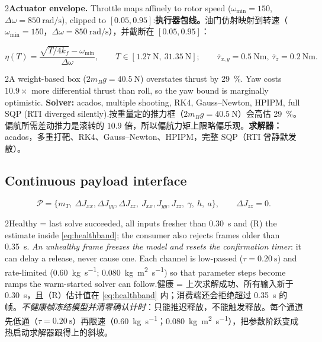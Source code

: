 \documentclass[10pt,a4paper]{article}
\numberwithin{equation}{section}
\newcommand{\dJ}{\Delta J}
\newcommand{\mB}{m_B}
\newcommand{\mT}{m_T}
\newcommand{\pair}[2]{\begin{paracol}{2}#1\switchcolumn #2\end{paracol}}
\newcommand{\bsub}[2]{\needspace{8\baselineskip}\subsection{#1\quad{\normalfont #2}}}
\begin{document}
\pair{\textbf{Actuator envelope.} Throttle maps affinely to rotor speed
($\omega_{\min}=150$, $\Delta\omega=\SI{850}{\radian\per\second}$), clipped to
$[0.05,0.95]$:}
{\textbf{执行器包线。}油门仿射映射到转速（$\omega_{\min}=150$，$\Delta\omega=\SI{850}{\radian\per\second}$），并截断在 $[0.05,0.95]$：}
\begin{equation}
\eta(T)=\frac{\sqrt{T/4k_f}-\omega_{\min}}{\Delta\omega},\qquad
T\in[\SI{1.27}{\newton},\ \SI{31.35}{\newton}];\qquad
\overline\tau_{x,y}=\SI{0.5}{\newton\meter},\ \overline\tau_z=\SI{0.2}{\newton\meter}.
\end{equation}
\pair{A weight-based box ($2\mB g=\SI{40.5}{\newton}$) overstates thrust by
\SI{29}{\percent}. Yaw costs $10.9\times$ more differential thrust than roll,
so the yaw bound is marginally optimistic. \textbf{Solver:} acados, multiple
shooting, RK4, Gauss--Newton, HPIPM, full SQP (RTI diverged silently).}
{按重量定的推力框（$2\mB g=\SI{40.5}{\newton}$）会高估 \SI{29}{\percent}。偏航所需差动推力是滚转的 $10.9$ 倍，所以偏航力矩上限略偏乐观。\textbf{求解器：}acados，多重打靶、RK4、Gauss--Newton、HPIPM，完整 SQP（RTI 曾静默发散）。}

\bsub{Continuous payload interface}{连续载荷接口}
\begin{equation}
\mathcal P=\{\mT,\ \dJ_{xx},\dJ_{yy},\dJ_{zz},\ J_{xx},J_{yy},J_{zz},\ \gamma,\ h,\ a\},
\qquad \dJ_{zz}=0 .
\end{equation}
\pair{Healthy = last solve succeeded, all inputs fresher than
\SI{0.30}{\second} and (R) the estimate inside \eqref{eq:healthband}; the consumer also rejects frames older than
\SI{0.35}{\second}. \emph{An unhealthy frame freezes the model and resets the
confirmation timer}: it can delay a release, never cause one. Each channel is
low-passed ($\tau=\SI{0.20}{\second}$) and rate-limited
(\SI{0.60}{\kg\per\second}; \SI{0.080}{\kg\meter\squared\per\second}) so that
parameter steps become ramps the warm-started solver can follow.}
{健康 = 上次求解成功、所有输入新于 \SI{0.30}{\second}，且（R）估计值在 \eqref{eq:healthband} 内；消费端还会拒绝超过 \SI{0.35}{\second} 的帧。\emph{不健康帧冻结模型并清零确认计时}：只能推迟释放，不能触发释放。每个通道先低通（$\tau=\SI{0.20}{\second}$）再限速（\SI{0.60}{\kg\per\second}；\SI{0.080}{\kg\meter\squared\per\second}），把参数阶跃变成热启动求解器跟得上的斜坡。}
\end{document}
